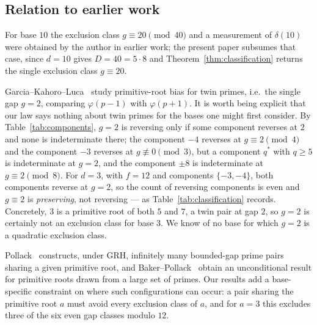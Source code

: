 \documentclass[11pt,reqno]{amsart}
\theoremstyle{plain}
\theoremstyle{definition}
\begin{document}
\subsection*{Relation to earlier work}
For base $10$ the exclusion class $g \equiv 20 \pmod{40}$ and a measurement of
$\delta(10)$ were obtained by the author in earlier work; the present paper
subsumes that case, since $d = 10$ gives $D = 40 = 5 \cdot 8$ and
Theorem~\ref{thm:classification} returns the single exclusion class
$g \equiv 20$.

Garcia--Kahoro--Luca~\cite{GarciaKahoroLuca2019} study primitive-root bias for
twin primes, i.e.\ the single gap $g = 2$, comparing $\varphi(p-1)$ with
$\varphi(p+1)$. It is worth being explicit that our law says nothing about
twin primes for the bases one might first consider. By
Table~\ref{tab:components}, $g = 2$ is reversing only if some component
reverses at $2$ and none is indeterminate there; the component $-4$ reverses
at $g \equiv 2 \pmod 4$ and the component $-3$ reverses at $g \not\equiv 0
\pmod 3$, but a component $q^*$ with $q \ge 5$ is indeterminate at $g = 2$,
and the component $\pm 8$ is indeterminate at $g \equiv 2 \pmod 8$. For
$d = 3$, with $f = 12$ and components $\{-3, -4\}$, both components reverse at
$g = 2$, so the count of reversing components is even and $g \equiv 2$ is
\emph{preserving}, not reversing --- as Table~\ref{tab:classification} records.
Concretely, $3$ is a primitive root of both $5$ and $7$, a twin pair at gap
$2$, so $g = 2$ is certainly not an exclusion class for base $3$. We know of
no base for which $g = 2$ is a quadratic exclusion class.

Pollack~\cite{Pollack2014} constructs, under GRH, infinitely many bounded-gap
prime pairs sharing a given primitive root, and
Baker--Pollack~\cite{BakerPollack2016} obtain an unconditional result for
primitive roots drawn from a large set of primes. Our results add a
base-specific constraint on where such configurations can occur: a pair
sharing the primitive root $a$ must avoid every exclusion class of $a$, and
for $a = 3$ this excludes three of the six even gap classes modulo $12$.
\end{document}
